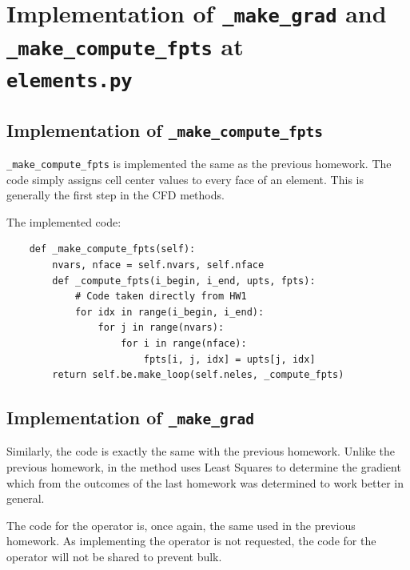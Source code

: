 \documentclass[a4paper, 12pt]{article}
\begin{document}
\section{Implementation of \texttt{\_make\_grad} and \texttt{\_make\_compute\_fpts} at\\\texttt{elements.py}}

\subsection{Implementation of \texttt{\_make\_compute\_fpts}}
\verb|_make_compute_fpts| is implemented the same as the previous homework. The code simply assigns cell center values to every face of an element. This is generally the first step in the CFD methods.\\\par

The implemented code:
\begin{verbatim}
    def _make_compute_fpts(self):
        nvars, nface = self.nvars, self.nface
        def _compute_fpts(i_begin, i_end, upts, fpts):
            # Code taken directly from HW1
            for idx in range(i_begin, i_end):
                for j in range(nvars):
                    for i in range(nface):
                        fpts[i, j, idx] = upts[j, idx]
        return self.be.make_loop(self.neles, _compute_fpts)
\end{verbatim}

\subsection{Implementation of \texttt{\_make\_grad}}
Similarly, the code is exactly the same with the previous homework. Unlike the previous homework, in the method uses Least Squares to determine the gradient which from the outcomes of the last homework was determined to work better in general.\\\par

The code for the operator is, once again, the same used in the previous homework. As implementing the operator is not requested, the code for the operator will not be shared to prevent bulk.\\\par
\end{document}
